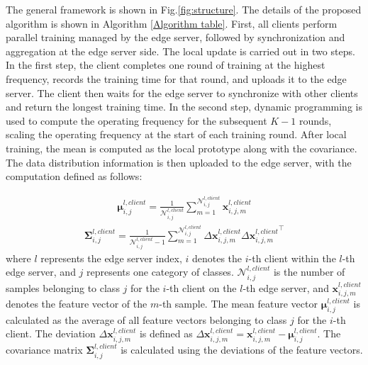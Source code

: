\documentclass[journal]{IEEEtran}
\begin{document}
The general framework is shown in Fig.\ref{fig:structure}. The details of the proposed algorithm is shown in Algorithm \ref{Algorithm table}. First, all clients perform parallel training managed by the edge server, followed by synchronization and aggregation at the edge server side. The local update is carried out in two steps. In the first step, the client completes one round of training at the highest frequency, records the training time for that round, and uploads it to the edge server. The client then waits for the edge server to synchronize with other clients and return the longest training time. In the second step, dynamic programming is used to compute the operating frequency for the subsequent $K-1$ rounds, scaling the operating frequency at the start of each training round. After local training, the mean is computed as the local prototype along with the covariance. The data distribution information is then uploaded to the edge server, with the computation defined as follows:

\begin{align}
  \label{client mean and covariance}
  \mathbf{\mu}^{l,client}_{i,j} = \frac{1}{\mathcal{N}^{l,client}_{i,j}} 
  \sum_{m=1}^{\mathcal{N}^{l,client}_{i,j}} \mathbf{x}^{l,client}_{i,j,m} 
\end{align}   
\begin{align}
  \mathbf{\Sigma}^{l,client}_{i,j} = \frac{1}{\mathcal{N}^{l,client}_{i,j}-1} 
  \sum_{m=1}^{\mathcal{N}^{l,client}_{i,j}} \Delta \mathbf{x}^{l,client}_{i,j,m} \Delta {\mathbf{x}^{l,client}_{i,j,m}}^\top
\end{align}
where \( l \) represents the edge server index, \( i \) denotes the \( i \)-th client within the \( l \)-th edge server, and \( j \) represents one category of classes. \( \mathcal{N}^{l,client}_{i,j} \) is the number of samples belonging to class \( j \) for the \( i \)-th client on the \( l \)-th edge server, and \( \mathbf{x}^{l,client}_{i,j,m} \) denotes the feature vector of the \( m \)-th sample. The mean feature vector \( \mathbf{\mu}^{l,client}_{i,j} \) is calculated as the average of all feature vectors belonging to class \( j \) for the \( i \)-th client. The deviation \( \Delta \mathbf{x}^{l,client}_{i,j,m} \) is defined as \( \Delta \mathbf{x}^{l,client}_{i,j,m} = \mathbf{x}^{l,client}_{i,j,m} - \mathbf{\mu}^{l,client}_{i,j} \). The covariance matrix \( \mathbf{\Sigma}^{l,client}_{i,j} \) is calculated using the deviations of the feature vectors.
\end{document}
